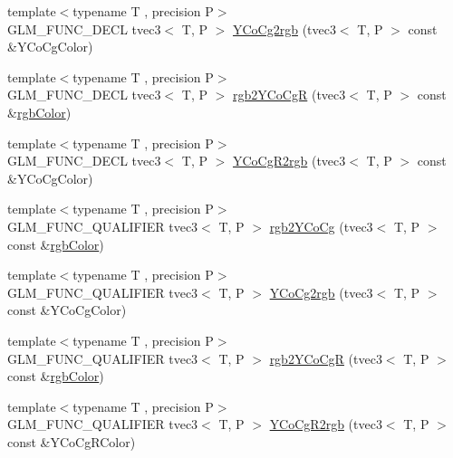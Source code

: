 \begin{DoxyCompactItemize}
\item 
{\footnotesize template$<$typename T , precision P$>$ }\\G\+L\+M\+\_\+\+F\+U\+N\+C\+\_\+\+D\+E\+C\+L tvec3$<$ T, P $>$ \hyperlink{group__gtx__color__space___y_co_cg_ga6d7e988a79b299ca1fa59f537e13800b}{Y\+Co\+Cg2rgb} (tvec3$<$ T, P $>$ const \&Y\+Co\+Cg\+Color)
\item 
{\footnotesize template$<$typename T , precision P$>$ }\\G\+L\+M\+\_\+\+F\+U\+N\+C\+\_\+\+D\+E\+C\+L tvec3$<$ T, P $>$ \hyperlink{group__gtx__color__space___y_co_cg_ga2e534594cc8ad252d23b14fb363ae9e2}{rgb2\+Y\+Co\+Cg\+R} (tvec3$<$ T, P $>$ const \&\hyperlink{group__gtx__color__space_ga36b0619e31daf57bc4a54dac2dcf34b7}{rgb\+Color})
\item 
{\footnotesize template$<$typename T , precision P$>$ }\\G\+L\+M\+\_\+\+F\+U\+N\+C\+\_\+\+D\+E\+C\+L tvec3$<$ T, P $>$ \hyperlink{group__gtx__color__space___y_co_cg_ga4bac5462c00df0ae89242ecdbbe5dbad}{Y\+Co\+Cg\+R2rgb} (tvec3$<$ T, P $>$ const \&Y\+Co\+Cg\+Color)
\item 
{\footnotesize template$<$typename T , precision P$>$ }\\G\+L\+M\+\_\+\+F\+U\+N\+C\+\_\+\+Q\+U\+A\+L\+I\+F\+I\+E\+R tvec3$<$ T, P $>$ \hyperlink{group__gtx__color__space___y_co_cg_ga19481f6947c5b5482debd41e71b8c941}{rgb2\+Y\+Co\+Cg} (tvec3$<$ T, P $>$ const \&\hyperlink{group__gtx__color__space_ga36b0619e31daf57bc4a54dac2dcf34b7}{rgb\+Color})
\item 
{\footnotesize template$<$typename T , precision P$>$ }\\G\+L\+M\+\_\+\+F\+U\+N\+C\+\_\+\+Q\+U\+A\+L\+I\+F\+I\+E\+R tvec3$<$ T, P $>$ \hyperlink{group__gtx__color__space___y_co_cg_ga6d7e988a79b299ca1fa59f537e13800b}{Y\+Co\+Cg2rgb} (tvec3$<$ T, P $>$ const \&Y\+Co\+Cg\+Color)
\item 
{\footnotesize template$<$typename T , precision P$>$ }\\G\+L\+M\+\_\+\+F\+U\+N\+C\+\_\+\+Q\+U\+A\+L\+I\+F\+I\+E\+R tvec3$<$ T, P $>$ \hyperlink{group__gtx__color__space___y_co_cg_ga2e534594cc8ad252d23b14fb363ae9e2}{rgb2\+Y\+Co\+Cg\+R} (tvec3$<$ T, P $>$ const \&\hyperlink{group__gtx__color__space_ga36b0619e31daf57bc4a54dac2dcf34b7}{rgb\+Color})
\item 
{\footnotesize template$<$typename T , precision P$>$ }\\G\+L\+M\+\_\+\+F\+U\+N\+C\+\_\+\+Q\+U\+A\+L\+I\+F\+I\+E\+R tvec3$<$ T, P $>$ \hyperlink{group__gtx__color__space___y_co_cg_ga4bac5462c00df0ae89242ecdbbe5dbad}{Y\+Co\+Cg\+R2rgb} (tvec3$<$ T, P $>$ const \&Y\+Co\+Cg\+R\+Color)

\end{DoxyCompactItemize}
